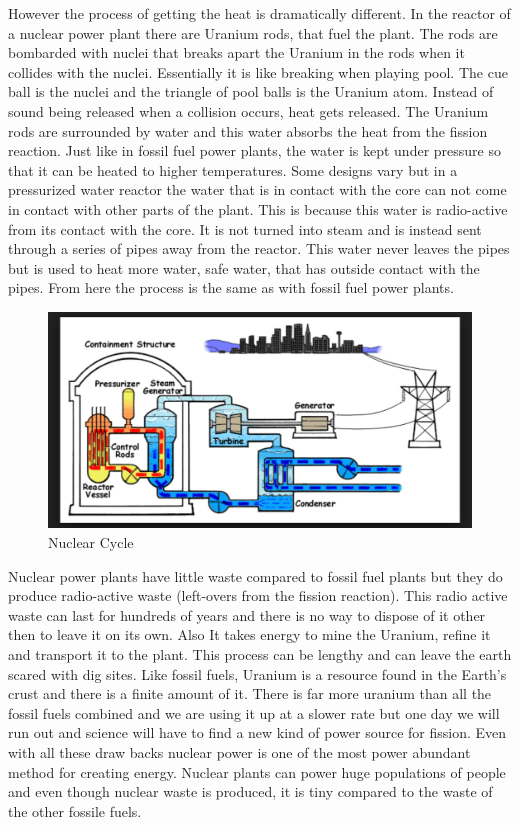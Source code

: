 \documentclass[msc,oneside]{ubcthesis}%
\begin{document}
However the process of getting the heat is dramatically different. In the reactor of a nuclear power 
plant there are Uranium rods, that fuel the plant. The rods are bombarded with nuclei that breaks apart the 
Uranium in the rods when it collides with the nuclei. Essentially it is like breaking when playing pool. The cue ball is the nuclei and 
the triangle of pool balls is the Uranium atom. Instead of sound being released when a collision occurs, 
heat gets released. The Uranium rods are surrounded by water and this water absorbs the heat from the 
fission reaction. Just like in fossil fuel power plants, the water is kept under pressure so that it can be 
heated to higher temperatures. Some designs vary but in a pressurized water reactor the water that is in contact with the core can not come in contact with other parts of the plant. This is because this water is radio-active from its contact with the core. It is not 
turned into steam and is instead sent through a series of pipes away from the reactor. This water never 
leaves the pipes but is used to heat more water, safe water, that has outside contact with the pipes. From 
here the process is the same as with fossil fuel power plants.

\begin{figure}[hbt]\label{nuclearCycle}
  \begin{center}
    \includegraphics[width=1\textwidth]{nuclear}
    \caption[Nuclear Cycle]{Nuclear Cycle \cite{Nuclear}}
  \end{center}
\end{figure}

Nuclear power plants have little waste compared to fossil fuel plants but they do 
produce radio-active waste (left-overs from the fission reaction). This radio active waste can last for hundreds of years and there is no way to dispose of it other then to leave it on its own. Also It takes energy to mine the Uranium, refine it and transport it to the plant. This process can be lengthy and can leave the earth scared with dig sites. Like fossil fuels, Uranium is a resource found in the Earth's crust and there is a finite amount of it. There is far more uranium than all the fossil fuels combined and we are using it up at a slower rate but one day we will run out and science will have to find a new kind of power source for fission. 
Even with all these draw backs nuclear power is one of the most power abundant method for creating energy. Nuclear plants can power huge populations of people and even though nuclear waste is produced, it is tiny compared to the waste of the other fossile fuels. 
\end{document}
